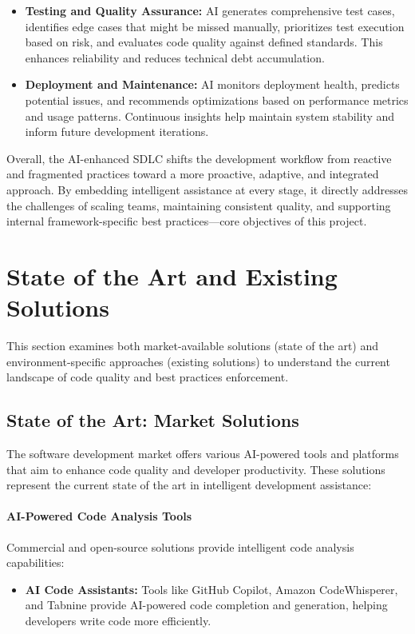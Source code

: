 \begin{spacing}{1.2}
\begin{itemize}
    \item \textbf{Testing and Quality Assurance:} AI generates comprehensive test cases, identifies edge cases that might be missed manually, prioritizes test execution based on risk, and evaluates code quality against defined standards. This enhances reliability and reduces technical debt accumulation.
    
    \item \textbf{Deployment and Maintenance:} AI monitors deployment health, predicts potential issues, and recommends optimizations based on performance metrics and usage patterns. Continuous insights help maintain system stability and inform future development iterations.
\end{itemize}

Overall, the AI-enhanced SDLC shifts the development workflow from reactive and fragmented practices toward a more proactive, adaptive, and integrated approach. By embedding intelligent assistance at every stage, it directly addresses the challenges of scaling teams, maintaining consistent quality, and supporting internal framework-specific best practices—core objectives of this project.

\section{State of the Art and Existing Solutions}

This section examines both market-available solutions (state of the art) and environment-specific approaches (existing solutions) to understand the current landscape of code quality and best practices enforcement.

\subsection{State of the Art: Market Solutions}

The software development market offers various AI-powered tools and platforms that aim to enhance code quality and developer productivity. These solutions represent the current state of the art in intelligent development assistance:

\paragraph{AI-Powered Code Analysis Tools}
Commercial and open-source solutions provide intelligent code analysis capabilities:

\begin{itemize}
    \item \textbf{AI Code Assistants:} Tools like GitHub Copilot, Amazon CodeWhisperer, and Tabnine provide AI-powered code completion and generation, helping developers write code more efficiently.
    

\end{itemize}
\end{spacing}

